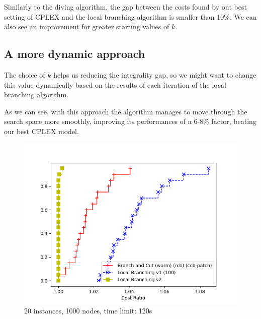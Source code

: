 Similarly to the diving algorithm, the gap between the costs found by out best setting of CPLEX and the local branching algorithm is smaller than 10\%. We can also see an improvement for greater starting values of $k$.

\subsection{A more dynamic approach}
The choice of $k$ helps us reducing the integrality gap, so we might want to change this value dynamically based on the results of each iteration of the local branching algorithm.

As we can see, with this approach the algorithm manages to move through the search space more smoothly, improving its performances of a 6-8\% factor, beating our best CPLEX model.

\begin{figure}[h]
    \centering
    \includegraphics*[width=.6\textwidth]{../plots/perfprof_lb_costs.png}
    \caption*{20 instances, 1000 nodes, time limit: 120s}
\end{figure}

